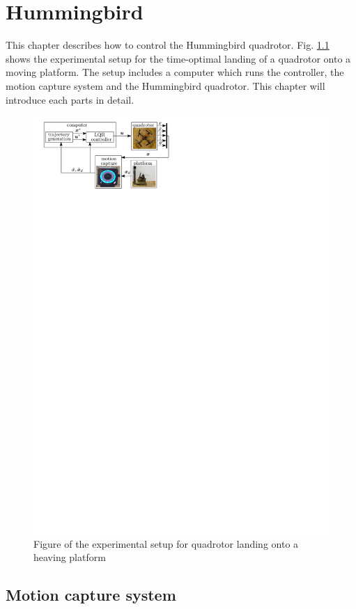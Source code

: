 \documentclass[idxtotoc,hyperref,openany]{labbook} %
\begin{document}
\tableofcontents
\chapter{Hummingbird}
This chapter describes how to control the Hummingbird quadrotor. Fig. \ref{fig_hummingbird} shows the experimental setup for the time-optimal landing of a quadrotor onto a moving platform. The setup includes a computer which runs the controller, the motion capture system and the Hummingbird quadrotor. This chapter will introduce each parts in detail. 

\begin{figure}
\centering
\includegraphics[scale=1]{./Figure/fig_ExperimentalSetup}
\caption{Figure of the experimental setup for quadrotor landing onto a heaving platform}\label{fig_hummingbird}
\end{figure}
\section{Motion capture system}
\end{document}
